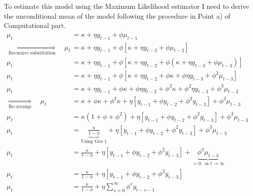 \documentclass{article}
\begin{document}
To estimate this model using the Maximum Likelihood estimator I need
to derive the unconditional mean of the model following the procedure
in Point a) of Computational part.
\begin{align*}
\mu_{t} & =\kappa+\eta y_{t-1}+\phi\mu_{t-1}\\
\underset{\text{Recursive substitution}}{\Longrightarrow}\quad\mu_{t} & =\kappa+\eta y_{t-1}+\phi\left[\kappa+\eta y_{t-2}+\phi\mu_{t-2}\right]\\
\mu_{t} & =\kappa+\eta y_{t-1}+\phi\left[\kappa+\eta y_{t-2}+\phi\left(\kappa+\eta y_{t-3}+\phi\mu_{t-3}\right)\right]\\
\mu_{t} & =\kappa+\eta y_{t-1}+\phi\left[\kappa+\eta y_{t-2}+\phi\kappa+\phi\eta y_{t-3}+\phi^{2}\mu_{t-3}\right]\\
\mu_{t} & =\kappa+\eta y_{t-1}+\phi\kappa+\phi\eta y_{t-2}+\phi^{2}\kappa+\phi^{2}\eta y_{t-3}+\phi^{3}\mu_{t-3}\\
\underset{\text{Re-arrange}}{\Longrightarrow}\quad\mu_{t} & =\kappa+\phi\kappa+\phi^{2}\kappa+\eta\left[y_{t-1}+\phi y_{t-2}+\phi^{2}y_{t-3}\right]+\phi^{3}\mu_{t-3}\\
\mu_{t} & =\kappa\left(1+\phi+\phi^{2}\right)+\eta\left[y_{t-1}+\phi y_{t-2}+\phi^{2}y_{t-3}\right]+\phi^{3}\mu_{t-3}\\
\mu_{t} & =\underbrace{\frac{\kappa}{1-\phi}}_{\text{Using Geo 1}}+\eta\left[y_{t-1}+\phi y_{t-2}+\phi^{2}y_{t-3}\right]+\phi^{3}\mu_{t-3}\\
\mu_{t} & =\frac{\kappa}{1-\phi}+\eta\left[y_{t-1}+\phi y_{t-2}+\phi^{2}y_{t-3}\right]+\underbrace{\phi^{3}\mu_{t-3}}_{=0,\text{ as }t\rightarrow\infty}\\
\mu_{t} & =\frac{\kappa}{1-\phi}+\eta\left[y_{t-1}+\phi y_{t-2}+\phi^{2}y_{t-3}\right]\\
\mu_{t} & =\frac{\kappa}{1-\phi}+\eta\sum_{s=0}^{\infty}\phi^{s}y_{t-s-1}
\end{align*}
\end{document}

